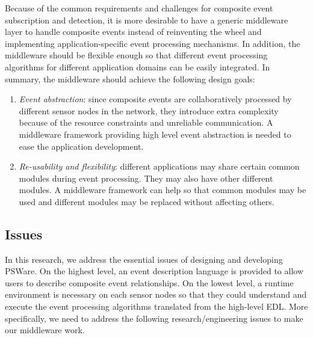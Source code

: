 Because of the common requirements and challenges for composite event subscription and detection, it is more desirable to have a generic middleware layer to handle composite events instead of reinventing the wheel and implementing application-specific event processing mechanisms. In addition, the middleware should be flexible enough so that different event processing algorithms for different application domains can be easily integrated. In summary, the middleware should achieve the following design goals:
\begin{enumerate}
\item \emph{Event abstraction}: since composite events are collaboratively processed by different sensor nodes in the network, they introduce extra complexity because of the resource constraints and unreliable communication. A middleware framework providing high level event abstraction is needed to ease the application development.
\item \emph{Re-usability and flexibility}: different applications may share certain common modules during event processing. They may also have other different modules. A middleware framework can help so that common modules may be used and different modules may be replaced without affecting others.
\end{enumerate}

\subsection{Issues}
In this research, we address the essential issues of designing and developing PSWare. On the highest level, an event description language is provided to allow users to describe composite event relationships. On the lowest level, a runtime environment is necessary on each sensor nodes so that they could understand and execute the event processing algorithms translated from the high-level EDL. More specifically, we need to address the following research/engineering issues to make our middleware work.

